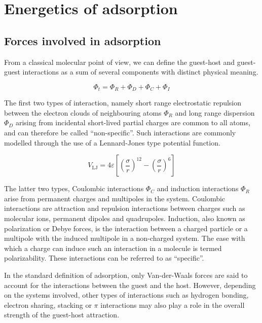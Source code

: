 
\section{Energetics of adsorption}

\subsection{Forces involved in adsorption}\label{calo:forces}

From a classical molecular point of view, we can define the
guest-host and guest-guest interactions as a sum of several
components with distinct physical meaning.

\begin{equation}\label{calo:eqn:interactions}
	\Phi_t = \Phi_{R} + \Phi_{D} + \Phi_{C} + \Phi_{I}
\end{equation}

The first two types of interaction, namely short range
electrostatic repulsion between the electron clouds of
neighbouring atoms \(\Phi_{R}\) and long range dispersion \(\Phi_{D}\) arising from
incidental short-lived partial charges are common to all
atoms, and can therefore be called ``non-specific''. Such
interactions are commonly modelled through the use of a
Lennard-Jones type potential function.

\begin{equation}\label{calo:eqn:lennard-jones}
	V_\text{LJ} = 4\varepsilon \left[ \left(\frac{\sigma}{r}\right)^{12} - \left(\frac{\sigma}{r}\right)^6 \right]
\end{equation}

The latter two types, Coulombic interactions \(\Phi_{C}\) and induction
interactions \(\Phi_{R}\) arise from permanent charges and multipoles in the
system. Coulombic interactions are attraction and repulsion
interactions between charges such as molecular ions, permanent
dipoles and quadrupoles.
Induction, also known as polarization or Debye forces, is the interaction
between a charged particle or a multipole with the induced multipole
in a non-charged system. The ease with which a charge can induce such an 
interaction in a molecule is termed polarizability. These interactions
can be referred to as ``specific''.

In the standard definition of adsorption, only
Van-der-Waals forces are said to account for the interactions between
the guest and the host. However, depending on the
systems involved, other types of interactions such
as hydrogen bonding, electron sharing, stacking or \( \pi \) interactions
may also play a role in the overall strength of the guest-host
attraction.

